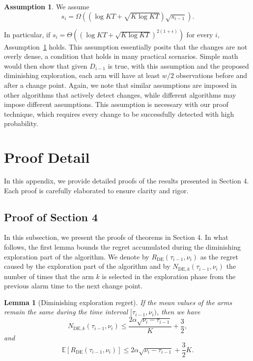 \documentclass[twoside]{article}
\newcommand{\E}{\mathbb{E}}
\theoremstyle{plain}
\newtheorem{lemma}[theorem]{Lemma}
\theoremstyle{definition}
\newtheorem{assumption}[theorem]{Assumption}
\theoremstyle{remark}
\begin{document}
\begin{assumption}\label{asm:seg_length}
    We assume
    \begin{equation}s_{i}= \Omega\left((\log{KT}+\sqrt{K\log{KT}})\sqrt{s_{i-1}}\right).
    \end{equation}
\end{assumption}

In particular, if $s_i = \Theta\left(\left(\log{KT}+\sqrt{K\log{KT}}\right)^{2(1+\epsilon)}\right)$ for every $i$, Assumption~\ref{asm:seg_length} holds.
This assumption essentially posits that the changes are not overly dense, a condition that holds in many practical scenarios. Simple math would then show that given $D_{i-1}$ is true, with this assumption and the proposed diminishing exploration, each arm will have at least $w/2$ observations before and after a change point. Again, we note that similar assumptions are imposed in other algorithms that actively detect changes, while different algorithms may impose different assumptions. This assumption is necessary with our proof technique, which requires every change to be successfully detected with high probability. 

\section{Proof Detail}
\label{app:pf_detail}

In this appendix, we provide detailed proofs of the results presented in Section 4. Each proof is carefully elaborated to ensure clarity and rigor.

\subsection{Proof of Section 4}\label{app:pf_detail:not_extend}
In this subsection, we present the proofs of theorems in Section 4. In what follows, the first lemma bounds the regret accumulated during the diminishing exploration part of the algorithm. We denote by $R_{\mathrm{DE}}\left(\tau_{i-1}, \nu_{i}\right)$ as the regret caused by the exploration part of the algorithm and by $N_{\mathrm{DE},k}\left(\tau_{i-1}, \nu_{i}\right)$ the number of times that the arm $k$ is selected in the exploration phase from the previous alarm time to the next change point.

\begin{lemma}[Diminishing exploration regret]\label{applemma:de_regret}
    If the mean values of the arms remain the same during the time interval $[\tau_{i-1}, \nu_{i})$, then we have
    \begin{equation}
        N_{\mathrm{DE},k}\left(\tau_{i-1}, \nu_{i}\right)\leq \frac{2\alpha\sqrt{\nu_{i}-\tau_{i-1}}}{K}+\frac{3}{2},
    \end{equation}
    and
    \begin{equation}
        \E\left[R_{\mathrm{DE}}\left(\tau_{i-1}, \nu_{i}\right)\right]\leq 2\alpha\sqrt{\nu_{i}-\tau_{i-1}}+\frac{3}{2}K.
    \end{equation}
\end{lemma}
\end{document}

